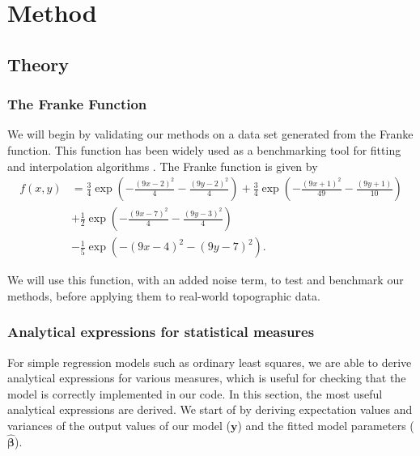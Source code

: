 \documentclass[12pt]{article}
\begin{document}
\section{Method} \label{sec:method}
\subsection{Theory}

\subsubsection{The Franke Function}
We will begin by validating our methods on a data set generated from the Franke function. This function has been widely used as a benchmarking tool for fitting and interpolation algorithms \cite{project1}. The Franke function is given by 
\begin{align}\label{eq:Franke}
    f(x,y) &= \frac{3}{4}\exp{\left(-\frac{(9x-2)^2}{4} - \frac{(9y-2)^2}{4}\right)}+\frac{3}{4}\exp{\left(-\frac{(9x+1)^2}{49}- \frac{(9y+1)}{10}\right)} \nonumber\nonumber \\
    &+\frac{1}{2}\exp{\left(-\frac{(9x-7)^2}{4} - \frac{(9y-3)^2}{4}\right)} \nonumber \\
    &-\frac{1}{5}\exp{\left(-(9x-4)^2 - (9y-7)^2\right) }.
\end{align}

We will use this function, with an added noise term, to test and benchmark our methods, before applying them to real-world topographic data. 

\subsubsection{Analytical expressions for statistical measures}

For simple regression models such as ordinary least squares, we are able to derive analytical expressions for various measures, which is useful for checking that the model is correctly implemented in our code. In this section, the most useful analytical expressions are derived. We start of by deriving expectation values and variances of the output values of our model ($\mathbf{y}$) and the fitted model parameters ($\hat{\boldsymbol{\beta}}$).
\end{document}
